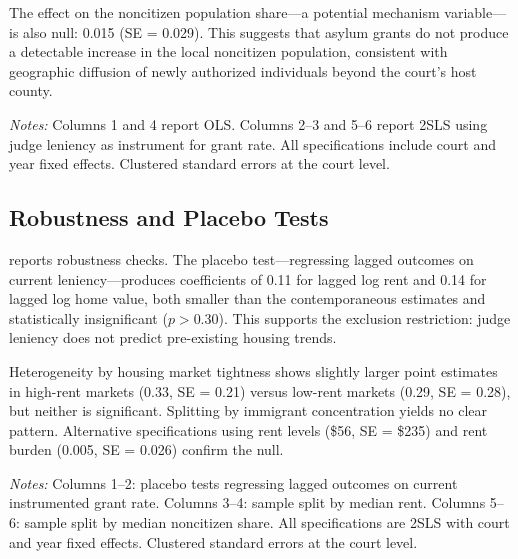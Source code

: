 \documentclass[12pt]{article}
\begin{document}
The effect on the noncitizen population share---a potential mechanism variable---is also null: 0.015 (SE = 0.029). This suggests that asylum grants do not produce a detectable increase in the local noncitizen population, consistent with geographic diffusion of newly authorized individuals beyond the court's host county.

\begin{table}[htbp]
\caption{OLS and 2SLS Estimates: Grant Rate and Housing Outcomes}\label{tab:main}

\begin{tablenotes}\small
\item \textit{Notes:} Columns 1 and 4 report OLS. Columns 2--3 and 5--6 report 2SLS using judge leniency as instrument for grant rate. All specifications include court and year fixed effects. Clustered standard errors at the court level.
\end{tablenotes}
\end{table}

\subsection{Robustness and Placebo Tests}

 reports robustness checks. The placebo test---regressing lagged outcomes on current leniency---produces coefficients of 0.11 for lagged log rent and 0.14 for lagged log home value, both smaller than the contemporaneous estimates and statistically insignificant ($p > 0.30$). This supports the exclusion restriction: judge leniency does not predict pre-existing housing trends.

Heterogeneity by housing market tightness shows slightly larger point estimates in high-rent markets (0.33, SE = 0.21) versus low-rent markets (0.29, SE = 0.28), but neither is significant. Splitting by immigrant concentration yields no clear pattern. Alternative specifications using rent levels (\$56, SE = \$235) and rent burden (0.005, SE = 0.026) confirm the null.

\begin{table}[htbp]
\caption{Robustness and Placebo Tests}\label{tab:robust}

\begin{tablenotes}\small
\item \textit{Notes:} Columns 1--2: placebo tests regressing lagged outcomes on current instrumented grant rate. Columns 3--4: sample split by median rent. Columns 5--6: sample split by median noncitizen share. All specifications are 2SLS with court and year fixed effects. Clustered standard errors at the court level.
\end{tablenotes}
\end{table}
\end{document}
